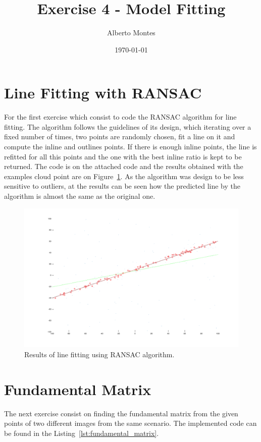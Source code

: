 \documentclass{ethz_report}
\title{Exercise 4 - Model Fitting}
\author{Alberto Montes}
\date{\today}
\begin{document}
\maketitle

\section*{Line Fitting with RANSAC}

For the first exercise which consist to code the RANSAC algorithm for line fitting. The algorithm
follows the guidelines of its design, which iterating over a fixed number of times, two points are
randomly chosen, fit a line on it and compute the inline and outlines points. If there is enough
inline points, the line is refitted for all this points and the one with the best inline ratio is
kept to be returned. The code is on the attached code and the results obtained with the
examples cloud point are on Figure~\ref{fig:ransac_img}. As the algorithm was design to be less sensitive
to outliers, at the results can be seen how the predicted line by the algorithm is almost the same
as the original one.

%

\begin{figure}[H]
\centering
\includegraphics[width=.8\linewidth]{images/ransac.png}
\caption{Results of line fitting using RANSAC algorithm.}
\label{fig:ransac_img}
\end{figure}

\section*{Fundamental Matrix}

The next exercise consist on finding the fundamental matrix from the given points of two different
images from the same scenario. The implemented code can be found in the Listing~\ref{lst:fundamental_matrix}.
\end{document}
